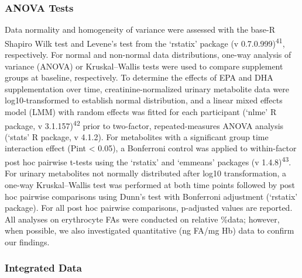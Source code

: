 \documentclass[journal=jacsat,manuscript=article]{achemso}
\begin{document}
\subsubsection{ANOVA Tests}\label{anova-tests}

Data normality and homogeneity of variance were assessed with the base-R
Shapiro Wilk test and Levene's test from the `rstatix' package (v
0.7.0.999)\textsuperscript{41}, respectively. For normal and non-normal
data distributions, one-way analysis of variance (ANOVA) or
Kruskal--Wallis tests were used to compare supplement groups at
baseline, respectively. To determine the effects of EPA and DHA
supplementation over time, creatinine-normalized urinary metabolite data
were log10-transformed to establish normal distribution, and a linear
mixed effects model (LMM) with random effects was fitted for each
participant (`nlme' R package, v 3.1.157)\textsuperscript{42} prior to
two-factor, repeated-measures ANOVA analysis (`stats' R package, v
4.1.2). For metabolites with a significant group time interaction effect
(Pint \textless{} 0.05), a Bonferroni control was applied to
within-factor post hoc pairwise t-tests using the `rstatix' and
`emmeans' packages (v 1.4.8)\textsuperscript{43}. For urinary
metabolites not normally distributed after log10 transformation, a
one-way Kruskal--Wallis test was performed at both time points followed
by post hoc pairwise comparisons using Dunn's test with Bonferroni
adjustment (`rstatix' package). For all post hoc pairwise comparisons,
p-adjusted values are reported. All analyses on erythrocyte FAs were
conducted on relative \%data; however, when possible, we also
investigated quantitative (ng FA/mg Hb) data to confirm our findings.

\subsubsection{Integrated Data}\label{integrated-data}
\end{document}
